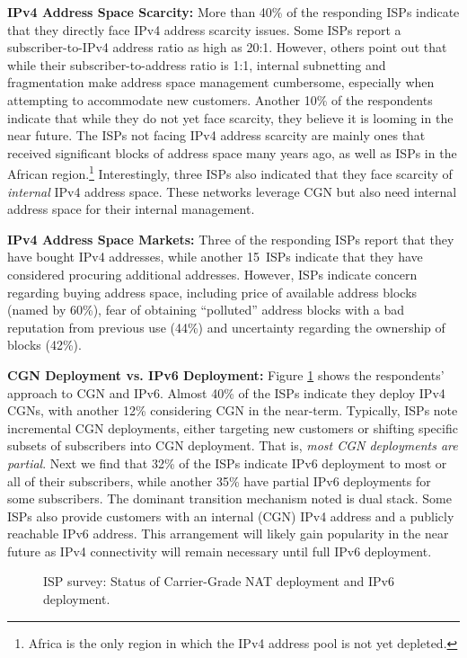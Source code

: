 \documentclass[10pt]{sig-alternate-05-2015}
\newcommand{\parax}[1]{\vspace{0.2em} \noindent \textbf{#1:}}
\begin{document}
\parax{IPv4 Address Space Scarcity}
More than 40\% of the responding ISPs indicate that they directly
face IPv4 address scarcity issues.  Some ISPs report a
subscriber-to-IPv4 address ratio as high as 20:1.  However, others
point out that while their subscriber-to-address ratio is 1:1,
internal subnetting and fragmentation make address space management
cumbersome, especially when attempting to accommodate new customers.
Another 10\% of the respondents indicate that while they do not yet
face scarcity, they believe it is looming in the near future.  The
ISPs not facing IPv4 address scarcity are mainly ones that received
significant blocks of address space many years ago, as well as ISPs
in the African region.\footnote{Africa is the only region in which
  the IPv4 address pool is not yet depleted.}  Interestingly, three
ISPs also indicated that they face scarcity of \textit{internal} IPv4
address space.  These networks leverage CGN but also need internal
address space for their internal management.

\parax{IPv4 Address Space Markets}
Three of the responding ISPs report that they have bought IPv4
addresses, while another 15~ISPs indicate that they have considered
procuring additional addresses.  However, ISPs indicate
concern regarding buying address space, including price of
available address blocks (named by 60\%), fear of obtaining ``polluted'' 
address blocks with a bad reputation from previous use (44\%) and uncertainty 
regarding the ownership of blocks (42\%).

\parax{CGN Deployment vs. IPv6 Deployment}
Figure \ref{fig:ispsurvey_piechart} shows the respondents' approach
to CGN and IPv6.  Almost 40\% of the ISPs indicate they deploy
IPv4 CGNs, with another 12\% considering CGN in the near-term.
Typically, ISPs note incremental CGN deployments, either targeting
new customers or shifting specific subsets of subscribers into CGN
deployment.  That is, \textit{most CGN deployments are partial}.
Next we find that 32\% of the ISPs indicate IPv6 deployment to most
or all of their subscribers, while another 35\% have partial IPv6
deployments for some subscribers.  The dominant transition mechanism
noted is dual stack.  Some ISPs also provide customers with an
internal (CGN) IPv4 address and a publicly reachable IPv6 address.
This arrangement will likely gain popularity in the near future as
IPv4 connectivity will remain necessary until full IPv6 deployment.

\begin{figure}
  \begin{center}
  \caption{ISP survey: Status of Carrier-Grade NAT deployment and IPv6 
  deployment.}
    \label{fig:ispsurvey_piechart}
  \end{center}
\vspace{-1em}
\end{figure}
\end{document}

